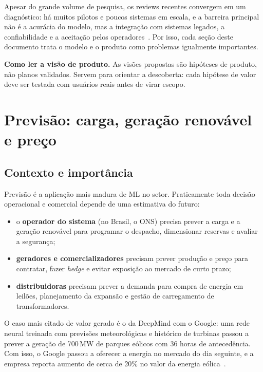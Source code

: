 \documentclass[11pt,a4paper]{article}
\begin{document}
Apesar do grande volume de pesquisa, os reviews recentes convergem em um
diagnóstico: há muitos pilotos e poucos sistemas em escala, e a barreira
principal não é a acurácia do modelo, mas a integração com sistemas legados, a
confiabilidade e a aceitação pelos operadores~\cite{energyinformatics2025,trustworthy2024}.
Por isso, cada seção deste documento trata o modelo e o produto
como problemas igualmente importantes.

\begin{nota}
\textbf{Como ler a visão de produto.} As visões propostas são hipóteses de
produto, não planos validados. Servem para orientar a descoberta: cada
hipótese de valor deve ser testada com usuários reais antes de virar escopo.
\end{nota}

\section{Previsão: carga, geração renovável e preço}

\subsection{Contexto e importância}

Previsão é a aplicação mais madura de ML no setor. Praticamente toda decisão
operacional e comercial depende de uma estimativa do futuro:

\begin{itemize}
  \item o \textbf{operador do sistema} (no Brasil, o ONS) precisa prever a carga
    e a geração renovável para programar o despacho, dimensionar reservas e
    avaliar a segurança;
  \item \textbf{geradores e comercializadores} precisam prever produção e preço
    para contratar, fazer \textit{hedge} e evitar exposição ao mercado de curto
    prazo;
  \item \textbf{distribuidoras} precisam prever a demanda para compra de energia
    em leilões, planejamento da expansão e gestão de carregamento de
    transformadores.
\end{itemize}

O caso mais citado de valor gerado é o da DeepMind com o Google: uma rede
neural treinada com previsões meteorológicas e histórico de turbinas passou
a prever a geração de 700\,MW de parques eólicos com 36 horas de
antecedência. Com isso, o Google passou a oferecer a energia no mercado
do dia seguinte, e a empresa reporta aumento de cerca de 20\% no valor da
energia eólica~\cite{deepmindwind}.
\end{document}
